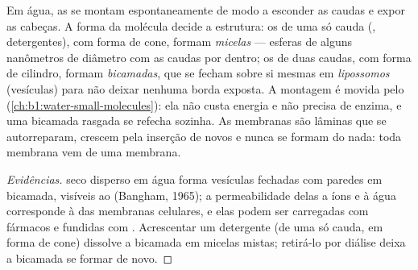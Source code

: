 \begin{proposition}[Automontagem]\label{prop:b1:lipids:selfassembly}
Em água, as  se montam espontaneamente de modo a
esconder as caudas e expor as cabeças. A forma da molécula decide a
estrutura: os  de uma só cauda (, detergentes), com
forma de cone, formam \emph{micelas} --- esferas de alguns nanômetros de
diâmetro com as caudas por dentro; os  de duas caudas, com
forma de cilindro, formam \emph{bicamadas}, que se fecham sobre si
mesmas em \emph{lipossomos} (vesículas) para não deixar nenhuma borda
exposta. A montagem é movida pelo 
(\cref{ch:b1:water-small-molecules}): ela não custa energia e não
precisa de enzima, e uma bicamada rasgada se refecha sozinha. As
membranas são lâminas que se autorreparam, crescem pela inserção de
 novos e nunca se formam do nada: toda membrana vem de uma
membrana.
\end{proposition}
\begin{proof}[Evidências]
 seco disperso em água forma vesículas fechadas com paredes
em bicamada, visíveis ao  (Bangham, 1965); a
permeabilidade delas a íons e à água corresponde à das membranas
celulares, e elas podem ser carregadas com fármacos e fundidas com
. Acrescentar um detergente (de uma só cauda, em forma de cone)
dissolve a bicamada em micelas mistas; retirá-lo por diálise deixa a
bicamada se formar de novo.
\end{proof}

